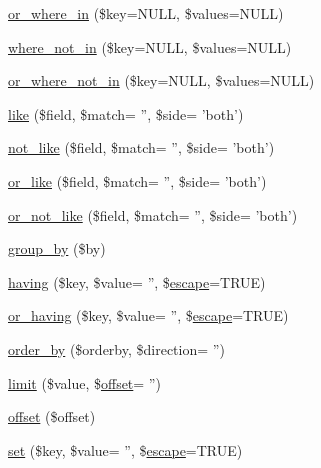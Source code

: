 \begin{DoxyCompactItemize}
\item 
\hyperlink{class_c_i___d_b__active__record_af3d06ae312c33df08f01c557c74c300c}{or\-\_\-where\-\_\-in} (\$key=N\-U\-L\-L, \$values=N\-U\-L\-L)
\item 
\hyperlink{class_c_i___d_b__active__record_a916d1fb578946ae0e9f7f4f9e556bb5c}{where\-\_\-not\-\_\-in} (\$key=N\-U\-L\-L, \$values=N\-U\-L\-L)
\item 
\hyperlink{class_c_i___d_b__active__record_a9c66c22c5268f00cfdee1e0cd5add5b6}{or\-\_\-where\-\_\-not\-\_\-in} (\$key=N\-U\-L\-L, \$values=N\-U\-L\-L)
\item 
\hyperlink{class_c_i___d_b__active__record_a015236670a8364b5f254f7743a94342d}{like} (\$field, \$match= '', \$side= 'both')
\item 
\hyperlink{class_c_i___d_b__active__record_a8e67ce1860b62c59cbf27844ba5e4630}{not\-\_\-like} (\$field, \$match= '', \$side= 'both')
\item 
\hyperlink{class_c_i___d_b__active__record_a25831efd5925dee48030eaeaf337e1c5}{or\-\_\-like} (\$field, \$match= '', \$side= 'both')
\item 
\hyperlink{class_c_i___d_b__active__record_a3bba159790b4904f8f19d4fd4d3d6c99}{or\-\_\-not\-\_\-like} (\$field, \$match= '', \$side= 'both')
\item 
\hyperlink{class_c_i___d_b__active__record_ac62c582e587dfea3b7671bb7a700e4ee}{group\-\_\-by} (\$by)
\item 
\hyperlink{class_c_i___d_b__active__record_adbeaab3e62553d410606bcc8a7c4e3b3}{having} (\$key, \$value= '', \$\hyperlink{class_c_i___d_b__driver_ac8f37ca5703d4558c732e692194f8cd6}{escape}=T\-R\-U\-E)
\item 
\hyperlink{class_c_i___d_b__active__record_a290ac4eca3794427c4f36026552e155b}{or\-\_\-having} (\$key, \$value= '', \$\hyperlink{class_c_i___d_b__driver_ac8f37ca5703d4558c732e692194f8cd6}{escape}=T\-R\-U\-E)
\item 
\hyperlink{class_c_i___d_b__active__record_ad0b080e339399fe9bc35142880f997b8}{order\-\_\-by} (\$orderby, \$direction= '')
\item 
\hyperlink{class_c_i___d_b__active__record_a7514ed2c519255f6ad52366ff2157b4a}{limit} (\$value, \$\hyperlink{class_c_i___d_b__active__record_afd31b65425a2b5cf30711bf29e1b1851}{offset}= '')
\item 
\hyperlink{class_c_i___d_b__active__record_afd31b65425a2b5cf30711bf29e1b1851}{offset} (\$offset)
\item 
\hyperlink{class_c_i___d_b__active__record_a0c43d8d98db94a956f172035ed147d55}{set} (\$key, \$value= '', \$\hyperlink{class_c_i___d_b__driver_ac8f37ca5703d4558c732e692194f8cd6}{escape}=T\-R\-U\-E)

\end{DoxyCompactItemize}
